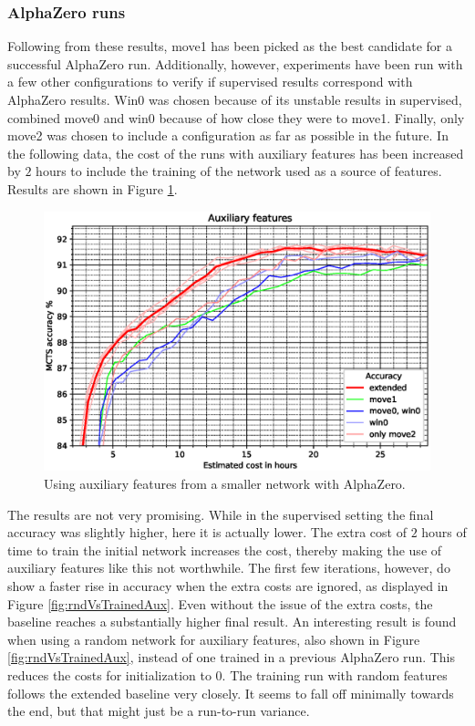 \documentclass[12pt,onecolumn,oneside,titlepage]{article}
\begin{document}
\subsubsection{AlphaZero runs}

Following from these results, move1 has been picked as the best candidate for a successful AlphaZero run. Additionally, however, experiments have been run with a few other configurations
to verify if supervised results correspond with AlphaZero results. 
Win0 was chosen because of its unstable results in supervised, combined move0 and win0 because of how close they were to move1. Finally, only move2 was chosen to include a configuration as far as possible in the future.
In the following data, the cost of the runs with auxiliary features has been increased by $2$ hours to include the training of the network used as a source of features. Results are shown in Figure \ref{fig:auxiliary_attempt1}.

\begin{figure}[H]
\centering
\includegraphics[clip,width=\columnwidth]{auxiliary_attempt1}
\caption{Using auxiliary features from a smaller network with AlphaZero.}
\label{fig:auxiliary_attempt1}
\end{figure}

The results are not very promising. While in the supervised setting the final accuracy was slightly higher, here it is actually lower.
The extra cost of $2$ hours of time to train the initial network increases the cost, thereby making the use of auxiliary features like this not worthwhile.
The first few iterations, however, do show a faster rise in accuracy when the extra costs are ignored, as displayed in Figure \ref{fig:rndVsTrainedAux}.
Even without the issue of the extra costs, the baseline reaches a substantially higher final result.
An interesting result is found when using a random network for auxiliary features, also shown in Figure \ref{fig:rndVsTrainedAux}, instead of one trained in a previous AlphaZero run. This reduces the costs for initialization to $0$. The training run with random features follows the extended baseline very closely.
It seems to fall off minimally towards the end, but that might just be a run-to-run variance. 
\end{document}
